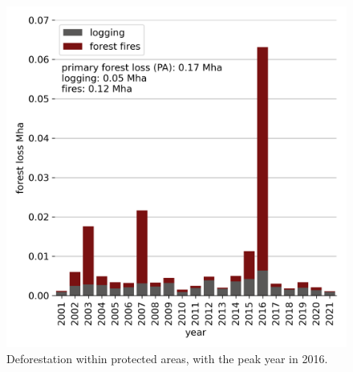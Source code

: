 \documentclass[
  letterpaper,
  DIV=11,
  numbers=noendperiod]{scrreprt}
\begin{document}
\begin{figure}
\begin{minipage}[t]{0.50\linewidth}
{{\includegraphics{text/../code/results/final_plots/deforestation_primary_forest_protected_areas.png}

}

}

\end{minipage}%

\caption{\label{fig-forestlossbarcharts_PA}Deforestation within
protected areas, with the peak year in 2016.}

\end{figure}
\end{document}
